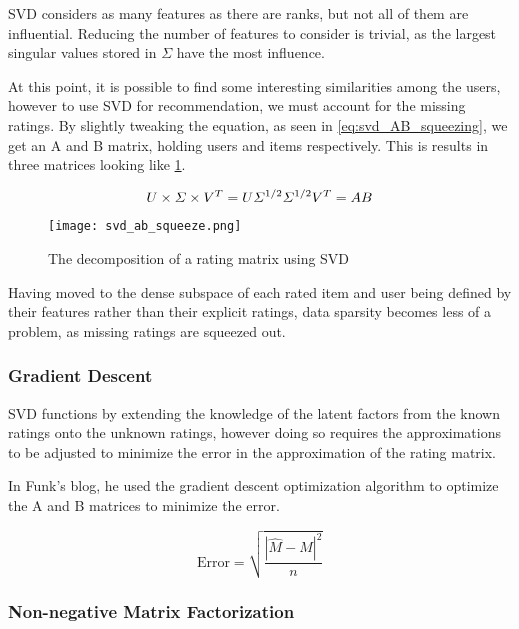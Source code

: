 SVD considers as many features as there are ranks, but not all of them are influential. Reducing the number of features to consider is trivial, as the largest singular values stored in $\Sigma$ have the most influence.

At this point, it is possible to find some interesting similarities among the users, however to use SVD for recommendation, we must account for the missing ratings. By slightly tweaking the equation, as seen in \ref{eq:svd_AB_squeezing}, we get an A and B matrix, holding users and items respectively. This is results in three matrices looking like \ref{fig:svd-ab-squeeze}.

\begin{equation} \label{eq:svd_AB_squeezing}
	\centering
	U\times \Sigma \times V^T = U\Sigma^{1/2} \Sigma^{1/2}V^T = AB
\end{equation}

\begin{figure} [H] \label{fig:svd-ab-squeeze}
	\centering
	\texttt{[image: svd\_ab\_squeeze.png]}
	\caption{The decomposition of a rating matrix using SVD}
\end{figure}
Having moved to the dense subspace of each rated item and user being defined by their features rather than their explicit ratings, data sparsity becomes less of a problem, as missing ratings are squeezed out.

\subsubsection{Gradient Descent}

SVD functions by extending the knowledge of the latent factors from the known ratings onto the unknown ratings, however doing so requires the approximations to be adjusted to minimize the error in the approximation of the rating matrix.

In Funk's blog, he used the gradient descent optimization algorithm to optimize the A and B matrices to minimize the error.

\begin{equation}
	\text{Error} = \sqrt{\frac{|\hat{M} - M|^2}{n}}
\end{equation}

\subsubsection{Non-negative Matrix Factorization}

